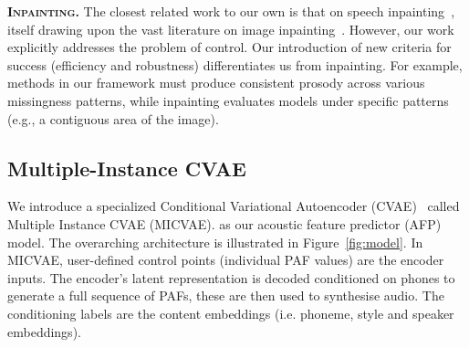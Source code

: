 \documentclass[a4paper,12pt,twoside,openright]{report}
\begin{document}


\textbf{\textsc{Inpainting}.} The closest related work to our own is that on speech inpainting~\parencite{Borsos2022SpeechPainterTS}, itself drawing upon the vast literature on image inpainting~\parencite{Elharrouss2019ImageIA}. 
However, our work explicitly addresses the problem of control. Our introduction of new criteria for success (efficiency and robustness) differentiates us from inpainting. For example, methods in our framework must produce consistent prosody across various missingness patterns, while inpainting evaluates models under specific patterns (e.g., a contiguous area of the image).

\subsection{Multiple-Instance CVAE}

We introduce a specialized Conditional Variational Autoencoder (CVAE)~\parencite{conditional-VAE:2015} called Multiple Instance CVAE (MICVAE). as our acoustic feature predictor (AFP) model. The overarching architecture is illustrated in Figure~\ref{fig:model}. In MICVAE, user-defined control points (individual PAF values) are the encoder inputs. The encoder's latent representation is decoded conditioned on phones to generate a full sequence of PAFs, these are then used to synthesise audio. The conditioning labels are the content embeddings (i.e. phoneme, style and speaker embeddings).

\end{document}
